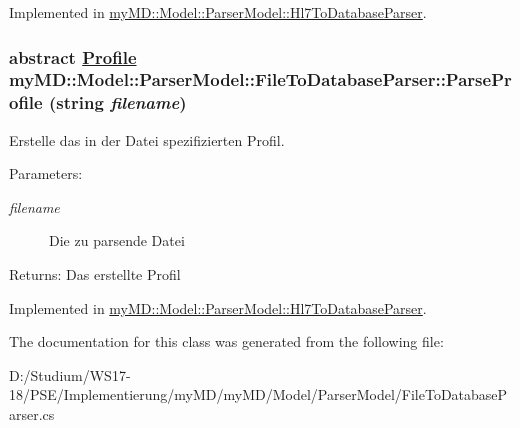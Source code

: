 Implemented in \hyperlink{classmy_m_d_1_1_model_1_1_parser_model_1_1_hl7_to_database_parser_84eaf7d498558fe57b2f248968a439b4}{my\-MD::Model::Parser\-Model::Hl7To\-Database\-Parser}.\hypertarget{classmy_m_d_1_1_model_1_1_parser_model_1_1_file_to_database_parser_3bb98e867ab361116982cfb17dfe8de9}{
\subsubsection[ParseProfile]{\setlength{\rightskip}{0pt plus 5cm}abstract \hyperlink{classmy_m_d_1_1_model_1_1_data_model_1_1_profile}{Profile} my\-MD::Model::Parser\-Model::File\-To\-Database\-Parser::Parse\-Profile (string {\em filename})}}
\label{df/d8f/classmy_m_d_1_1_model_1_1_parser_model_1_1_file_to_database_parser_3bb98e867ab361116982cfb17dfe8de9}


Erstelle das in der Datei spezifizierten Profil. 

\begin{Desc}
\item[Parameters:]
\begin{description}
\item[{\em filename}]Die zu parsende Datei\end{description}
\end{Desc}
\begin{Desc}
\item[Returns:]Das erstellte Profil\end{Desc}


Implemented in \hyperlink{classmy_m_d_1_1_model_1_1_parser_model_1_1_hl7_to_database_parser_3bb98e867ab361116982cfb17dfe8de9}{my\-MD::Model::Parser\-Model::Hl7To\-Database\-Parser}.

The documentation for this class was generated from the following file:\begin{CompactItemize}
\item 
D:/Studium/WS17-18/PSE/Implementierung/my\-MD/my\-MD/Model/Parser\-Model/File\-To\-Database\-Parser.cs\end{CompactItemize}

